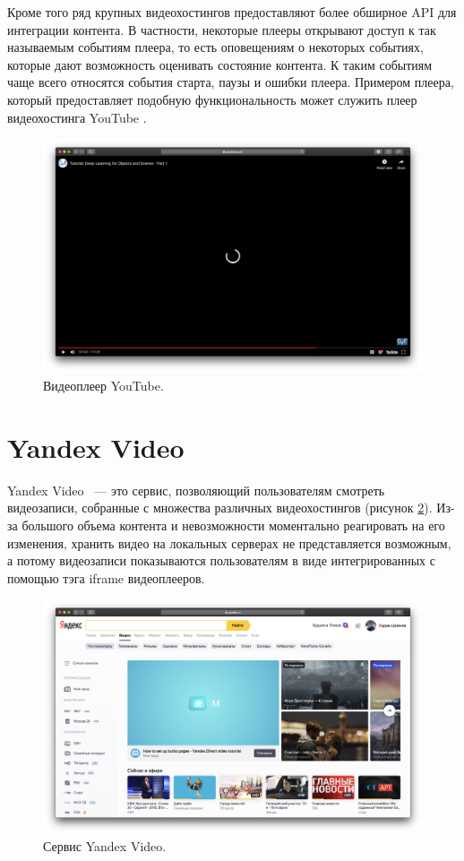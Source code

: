 Кроме того ряд крупных видеохостингов предоставляют более обширное API для интеграции контента. В частности, некоторые плееры открывают доступ к так называемым событиям плеера, то есть оповещениям о некоторых событиях, которые дают возможность оценивать состояние контента. К таким событиям чаще всего относятся события старта, паузы и ошибки плеера. Примером плеера, который предоставляет подобную функциональность может служить плеер видеохостинга YouTube \cite{YouTubeAPI}.

\begin{figure}
    \centering
    \includegraphics[width=\textwidth]{../images/youtube_good.png}
    \caption{Видеоплеер YouTube.}
    \label{fig:youtube_good}
\end{figure}

\section{Yandex Video}

Yandex Video \cite{VideoSearch}~--- это сервис, позволяющий пользователям смотреть видеозаписи, собранные с множества различных видеохостингов (рисунок \ref{fig:yandex_video}). Из-за большого объема контента и невозможности моментально реагировать на его изменения, хранить видео на локальных серверах не представляется возможным, а потому видеозаписи показываются пользователям в виде интегрированных с помощью тэга iframe видеоплееров.

\begin{figure}
    \centering
    \includegraphics[width=\textwidth]{../images/yandex_video.png}
    \caption{Сервис Yandex Video.}
    \label{fig:yandex_video}
\end{figure}


